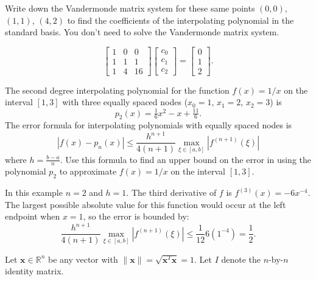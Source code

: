 \documentclass[11pt]{exam}
\newcommand{\R}{\mathbb{R}}
\begin{document}
\begin{questions}
\newpage
\question Write down the Vandermonde matrix system for these same points $(0,0)$, $(1,1)$, $(4,2)$ to find the coefficients of the interpolating polynomial in the standard basis. You don't need to solve the Vandermonde matrix system.
\begin{solution}
$$\begin{bmatrix} 1 & 0 & 0 \\ 1 & 1 & 1 \\ 1 & 4 & 16\end{bmatrix} \begin{bmatrix} c_0 \\ c_1 \\ c_2 \end{bmatrix} = \begin{bmatrix} 0 \\ 1 \\ 2 \end{bmatrix}.$$
\end{solution}
\vfill


\question The second degree interpolating polynomial for the function $f(x) = 1/x$ on the interval $[1,3]$ with three equally spaced nodes ($x_0 = 1$, $x_1=2$, $x_2 =3$) is 
$$p_2(x) = \tfrac{1}{6}x^2 - x + \tfrac{11}{6}.$$
The error formula for interpolating polynomials with equally spaced nodes is 
$$|f(x)-p_n(x)| \le \frac{h^{n+1}}{4(n+1)} \max_{\xi \in [a,b]} |f^{(n+1)}(\xi)|$$ 
where $h = \tfrac{b-a}{n}$.  Use this formula to find an upper bound on the error in using the polynomial $p_2$ to approximate $f(x) = 1/x$ on the interval $[1,3]$.  
\begin{solution}
In this example $n = 2$ and $h = 1$.  The third derivative of $f$ is $f^{(3)}(x) = -6 x^{-4}$. The largest possible absolute value for this function would occur at the left endpoint when $x = 1$, so the error is bounded by:
$$ \frac{h^{n+1}}{4(n+1)} \max_{\xi \in [a,b]} |f^{(n+1)}(\xi)| \le \frac{1}{12} 6(1^{-4}) = \frac{1}{2}.$$ 
\end{solution}
\vfill



\question Let $\mathbf{x} \in \R^n$ be any vector with $\|\mathbf{x}\| = \sqrt{\mathbf{x}^T \mathbf{x}} = 1$.  Let $I$ denote the $n$-by-$n$ identity matrix.  
\end{questions}
\end{document}
